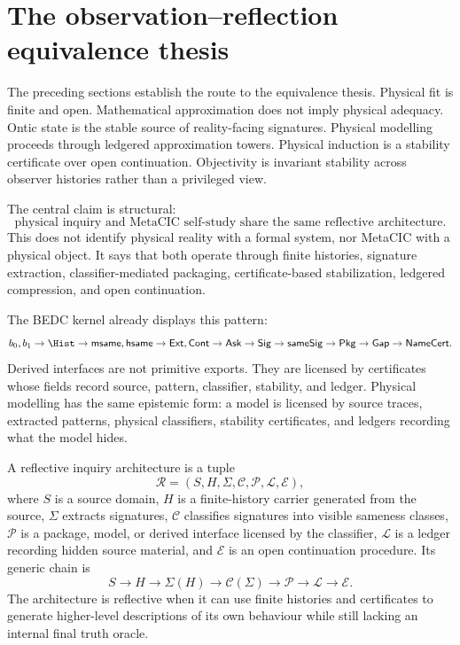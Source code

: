 \section{The observation--reflection equivalence thesis}
\label{sec:observation-and-reflection}

The preceding sections establish the route to the equivalence thesis. Physical fit is finite and open. Mathematical approximation does not imply physical adequacy. Ontic state is the stable source of reality-facing signatures. Physical modelling proceeds through ledgered approximation towers. Physical induction is a stability certificate over open continuation. Objectivity is invariant stability across observer histories rather than a privileged view.

The central claim is structural:
$$
\text{physical inquiry and MetaCIC self-study share the same reflective architecture}.
$$
This does not identify physical reality with a formal system, nor MetaCIC with a physical object. It says that both operate through finite histories, signature extraction, classifier-mediated packaging, certificate-based stabilization, ledgered compression, and open continuation.

The BEDC kernel already displays this pattern:
$$
b_0,b_1
\to
\Hist
\to
\mathsf{msame},\mathsf{hsame}
\to
\mathsf{Ext},\mathsf{Cont}
\to
\mathsf{Ask}
\to
\mathsf{Sig}
\to
\mathsf{sameSig}
\to
\mathsf{Pkg}
\to
\mathsf{Gap}
\to
\mathsf{NameCert}.
$$
Derived interfaces are not primitive exports. They are licensed by certificates whose fields record source, pattern, classifier, stability, and ledger. Physical modelling has the same epistemic form: a model is licensed by source traces, extracted patterns, physical classifiers, stability certificates, and ledgers recording what the model hides.

\begin{definition}
\label{def:reflective-inquiry-system}
A reflective inquiry architecture is a tuple
$$
\mathcal R
=
(S,H,\Sigma,\mathcal C,\mathcal P,\mathcal L,\mathcal E),
$$
where $S$ is a source domain, $H$ is a finite-history carrier generated from the source, $\Sigma$ extracts signatures, $\mathcal C$ classifies signatures into visible sameness classes, $\mathcal P$ is a package, model, or derived interface licensed by the classifier, $\mathcal L$ is a ledger recording hidden source material, and $\mathcal E$ is an open continuation procedure. Its generic chain is
$$
S
\to
H
\to
\Sigma(H)
\to
\mathcal C(\Sigma)
\to
\mathcal P
\to
\mathcal L
\to
\mathcal E.
$$
The architecture is reflective when it can use finite histories and certificates to generate higher-level descriptions of its own behaviour while still lacking an internal final truth oracle.
\end{definition}

